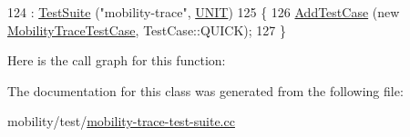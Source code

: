 \begin{DoxyCode}
124   : \hyperlink{classns3_1_1TestSuite_a904b0c40583b744d30908aeb94636d1a}{TestSuite} (\textcolor{stringliteral}{"mobility-trace"}, \hyperlink{classns3_1_1TestSuite_a1ebfcab34ec8161e085e8e3a1855eae0a3885375a3787abf60431f8454b3cadbd}{UNIT})
125 \{
126   \hyperlink{classns3_1_1TestCase_a3718088e3eefd5d6454569d2e0ddd835}{AddTestCase} (\textcolor{keyword}{new} \hyperlink{classMobilityTraceTestCase}{MobilityTraceTestCase}, TestCase::QUICK);
127 \}
\end{DoxyCode}


Here is the call graph for this function\+:




The documentation for this class was generated from the following file\+:\begin{DoxyCompactItemize}
\item 
mobility/test/\hyperlink{mobility-trace-test-suite_8cc}{mobility-\/trace-\/test-\/suite.\+cc}\end{DoxyCompactItemize}
